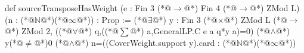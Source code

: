 def sourceTransposeHasWeight (e : Fin 3 (*@$\to$@*) Fin 4 (*@$\to$@*) ZMod L) (n : (*@$\mathbb N$@*)(*@$\infty$@*)) : Prop :=
  (*@$\exists$@*) y : Fin 3 (*@$\times$@*) ZMod L (*@$\to$@*) ZMod 2,
    ((*@$\forall$@*) q,((*@$\sum$@*) a,GeneralLP.C e a q*y a)=0) (*@$\land$@*) y(*@$\ne$@*)0 (*@$\land$@*) n=((CoverWeight.support y).card : (*@$\mathbb N$@*)(*@$\infty$@*))
